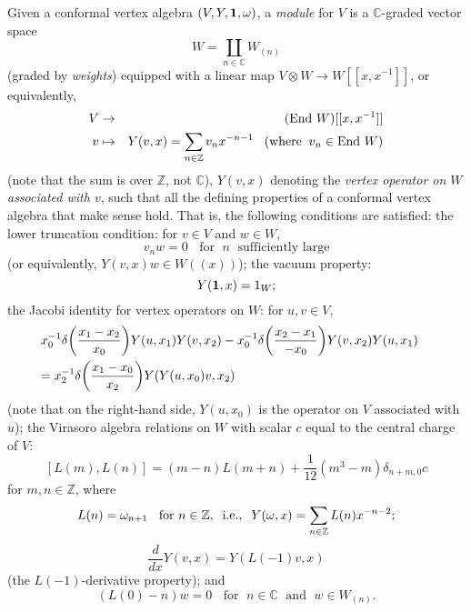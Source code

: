 \documentclass[12pt]{article}
\begin{document}
\begin{defi}\label{cvamodule}
{\rm  Given a conformal vertex algebra
$(V,Y,{\bf 1},\omega)$,  a {\it module} for $V$ is a ${\mathbb C}$-graded
vector space
\begin{equation}\label{Wgrading}
W=\coprod_{n\in{\mathbb C}} W_{(n)}
\end{equation}
(graded by {\it weights}) equipped with a linear map
$V\otimes W \rightarrow W[[x,x^{-1}]]$, or equivalently,
\begin{eqnarray}\label{YforW}
V &\rightarrow & (\mbox{End}\ W)[[x,x^{-1}]] \nonumber\\
v&\mapsto & Y(v,x) =\sum_{n\in {\mathbb Z}}v_nx^{-n-1}\;\;\;
(\mbox{where}\;\; v_n \in \mbox{End}\ W)
\end{eqnarray}
(note that the sum is over ${\mathbb Z}$, not ${\mathbb C}$), $Y(v,x)$
denoting the {\it vertex operator on $W$ associated with $v$}, such
that all the defining properties of a conformal vertex algebra that
make sense hold.  That is, the following conditions are satisfied: the
lower truncation condition: for $v \in V$ and $w \in W$,
\begin{equation}\label{ltc-w}
v_nw = 0 \;\;\mbox{ for }\;n\;\mbox{ sufficiently large}
\end{equation}
(or equivalently, $Y(v, x)w\in W((x))$); the vacuum property:
\begin{equation}\label{m-1left}
Y(\mbox{\bf 1},x) = 1_W;
\end{equation}
the Jacobi identity for vertex operators on $W$: for $u, v \in V$,
\begin{eqnarray}\label{m-Jacobi}
&{\displaystyle x^{-1}_0\delta \bigg( {x_1-x_2\over x_0}\bigg)
Y(u,x_1)Y(v,x_2) - x^{-1}_0\delta \bigg( {x_2-x_1\over -x_0}\bigg)
Y(v,x_2)Y(u,x_1)}&\nonumber\\
&{\displaystyle = x^{-1}_2\delta \bigg( {x_1-x_0\over x_2}\bigg)
Y(Y(u,x_0)v,x_2)}
\end{eqnarray}
(note that on the right-hand side, $Y(u,x_0)$ is the operator on $V$
associated with $u$); the Virasoro algebra relations on $W$ with
scalar $c$ equal to the central charge of $V$:
\begin{equation}\label{m-vir1}
[L(m), L(n)]=(m-n)L(m+n)+{\displaystyle\frac{1}{12}}
(m^3-m)\delta_{n+m,0}c
\end{equation}
for $m,n \in {\mathbb Z}$, where
\begin{equation}\label{m-vir2}
L(n)=\omega _{n+1}\;\; \mbox{ for }n\in{\mathbb Z}, \;\;{\rm
i.e.},\;\;Y(\omega, x)=\sum_{n\in{\mathbb Z}}L(n)x^{-n-2};
\end{equation}
\begin{equation}\label{L-1}
\displaystyle \frac{d}{dx}Y(v, x)=Y(L(-1)v, x)
\end{equation}
(the $L(-1)$-derivative property); and
\begin{equation}\label{wl0}
(L(0)-n)w=0\;\;\mbox{ for }\;n\in {\mathbb C}\;\mbox{ and }\;w\in W_{(n)}.
\end{equation}
}
\end{defi}
\end{document}
